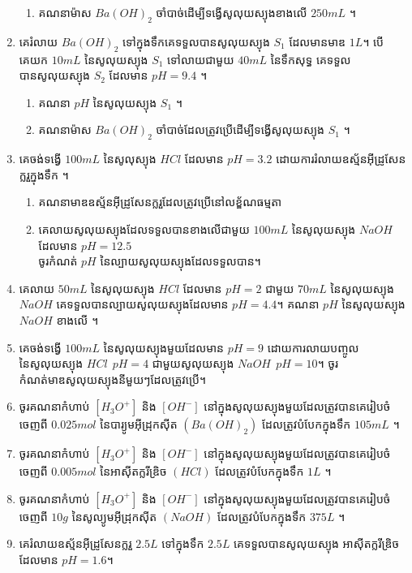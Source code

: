 \documentclass[12pt, a4paper]{article}
\begin{document}
\begin{enumerate}[m]
\begin{enumerate}[k]
		\item គណនាម៉ាស $Ba\left(OH\right)_2$ ចាំបាច់ដើម្បីទង្វើសូលុយស្យុងខាងលើ $250mL$ ។
	\end{enumerate}
	\item គេរំលាយ $Ba\left(OH\right)_{2}$ ទៅក្នុងទឹកគេទទួលបានសូលុយស្យុង $S_{1}$ ដែលមានមាឌ $1L$។ បើគេយក $10mL$ នៃសូលុយស្យុង $S_{1}$ ទៅលាយជាមួយ $40mL$ នៃទឹកសុទ្ធ គេទទួលបានសូលុយស្យុង $S_{2}$ ដែលមាន $pH=9.4$ ។ 
	\begin{enumerate}[k]
		\item គណនា $pH$ នៃសូលុយស្យុង $S_{1}$ ។
		\item គណនាម៉ាស $Ba\left(OH\right)_{2}$ ចាំបាច់ដែលត្រូវប្រើដើម្បីទង្វើសូលុយស្យុង $S_{1}$ ។
	\end{enumerate}
	\item គេចង់ទង្វើ $100mL$ នៃសូលុស្យុង $HCl$ ដែលមាន $pH=3.2$ ដោយការរំលាយឧស្ម័នអុីដ្រូសែនក្លរួក្នុងទឹក ។
	\begin{enumerate}[k]
		\item គណនាមាឌឧស្ម័នអុីដ្រូសែនក្លរួដែលត្រូវប្រើនៅលខ្ឌ័ណធម្មតា
		\item គេលាយសូលុយស្យុងដែលទទួលបានខាងលើជាមួយ $100mL$ នៃសូលុយស្យុង $NaOH$ ដែលមាន $pH=12.5$\\
		ចូរកំណត់ $pH$ នៃល្បាយសូលុយស្យុងដែលទទួលបាន។
	\end{enumerate}
	\item គេលាយ $50mL$ នៃសូលុយស្យុង $HCl$ ដែលមាន $pH=2$ ជាមួយ $70mL$ នៃសូលុយស្យុង $NaOH$ គេទទួលបានល្បាយសូលុយស្យុងដែលមាន $pH=4.4$។ គណនា $pH$ នៃសូលុយស្យុង $NaOH$ ខាងលើ ។
	\item គេចង់ទង្វើ $100mL$ នៃសូលុយស្យុងមួយដែលមាន $pH=9$ ដោយការលាយបញ្ចូលនៃសូលុយស្យុង $HCl~~pH=4$ ជាមួយសូលុយស្យុង $NaOH~~pH=10$។ ចូរកំណត់មាឌសូលុយស្យុងនីមួយៗដែលត្រូវប្រើ។
	\item ចូរគណនាកំហាប់ $\left[H_{3}O^{+}\right]$ និង $\left[OH^{-}\right]$ នៅក្នុងសូលុយស្យុងមួយដែលត្រូវបានគេរៀបចំចេញពី $0.025mol$ នៃបារ្យូមអុីដ្រុកសុីត $\left(Ba\left(OH\right)_{2}\right)$ ដែលត្រូវបំបែកក្នុងទឹក $105mL$ ។
	\item ចូរគណនាកំហាប់ $\left[H_{3}O^{+}\right]$ និង $\left[OH^{-}\right]$ នៅក្នុងសូលុយស្យុងមួយដែលត្រូវបានគេរៀបចំចេញពី $0.005mol$ នៃអាស៊ីតក្លរីឌ្រិច $\left(HCl\right)$ ដែលត្រូវបំបែកក្នុងទឹក $1L$ ។
	\item ចូរគណនាកំហាប់ $\left[H_{3}O^{+}\right]$ និង $\left[OH^{-}\right]$ នៅក្នុងសូលុយស្យុងមួយដែលត្រូវបានគេរៀបចំចេញពី $10g$ នៃសូល្យូមអុីដ្រុកសុីត $\left(NaOH\right)$ ដែលត្រូវបំបែកក្នុងទឹក $375L$ ។
	\item គេរំលាយឧស្ម័នអុីដ្រូសែនក្លរួ $2.5L$ ទៅក្នុងទឹក $2.5L$ គេទទួលបានសូលុយស្យុង អាស៊ីតក្លរីឌ្រិចដែលមាន $pH=1.6$។

\end{enumerate}
\end{document}
